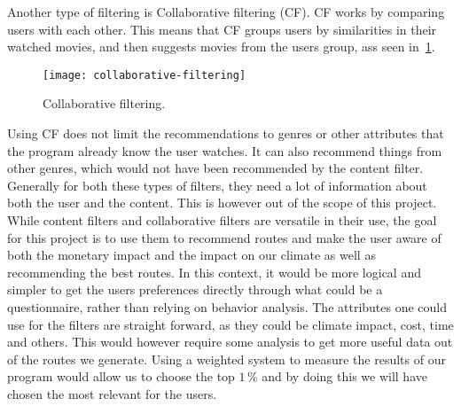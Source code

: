 Another type of filtering is Collaborative filtering (CF).
CF works by comparing users with each other.
This means that CF groups users by similarities in their watched movies, and then suggests movies from the users group,
ass seen in~\ref{fig:figure4}.

\begin{figure}
    \centering
    \texttt{[image: collaborative-filtering]}
    \caption{Collaborative filtering.}
    \label{fig:figure4}
\end{figure}

Using CF does not limit the recommendations to genres or other attributes that the program already know the user
watches.
It can also recommend things from other genres, which would not have been recommended by the content filter.
Generally for both these types of filters, they need a lot of information about both the user and the content.
This is however out of the scope of this project.
While content filters and collaborative filters are versatile in their use, the goal for this project is to use them to
recommend routes and make the user aware of both the monetary impact and the impact on our climate as well as
recommending the best routes.
In this context, it would be more logical and simpler to get the users preferences directly through what could be a
questionnaire, rather than relying on behavior analysis.
The attributes one could use for the filters are straight forward, as they could be climate impact, cost, time and
others.
This would however require some analysis to get more useful data out of the routes we generate.
Using a weighted system to measure the results of our program would allow us to choose the top \(1\,\%\) and by doing
this we will have chosen the most relevant for the users.
